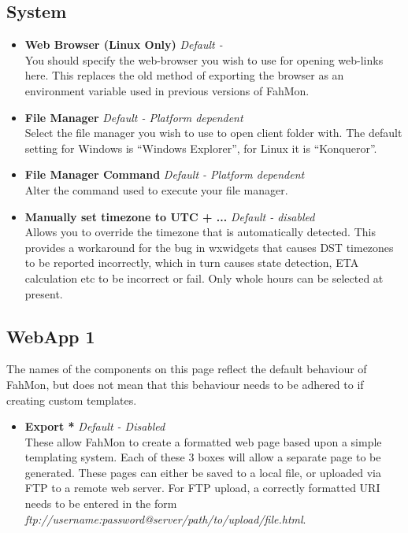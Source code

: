 \subsection{System}
\begin{itemize}
\item   \textbf{Web Browser (Linux Only)} \textit{Default - }
  \\You should specify the web-browser you wish to use for opening web-links
   here. This replaces the old method of exporting the browser as an environment
   variable used in previous versions of FahMon.
\item   \textbf{File Manager} \textit{Default - Platform dependent}
  \\Select the file manager you wish to use to open client folder with. The
   default setting for Windows is ``Windows Explorer'', for Linux it is
   ``Konqueror''.
\item   \textbf{File Manager Command} \textit{Default - Platform dependent}
  \\Alter the command used to execute your file manager.
\item   \textbf{Manually set timezone to UTC + ...} \textit{Default - disabled}
  \\Allows you to override the timezone that is automatically detected. This
   provides a workaround for the bug in wxwidgets that causes DST timezones to
   be reported incorrectly, which in turn causes state detection, ETA
   calculation etc to be incorrect or fail. Only whole hours can be selected at
   present.
\end{itemize}

\subsection{WebApp 1}
The names of the components on this page reflect the default behaviour of
FahMon, but does not mean that this behaviour needs to be adhered to if creating
custom templates.
\begin{itemize}
 \item \textbf{Export *} \textit{Default - Disabled}
  \\These allow FahMon to create a formatted web page based upon a simple
   templating system. Each of these 3 boxes will allow a separate page to be
   generated. These pages can either be saved to a local file, or uploaded via
   FTP to a remote web server. For FTP upload, a correctly formatted URI needs
   to be entered in the form\\
   \textit{ftp://username:password@server/path/to/upload/file.html}.
\end{itemize}

